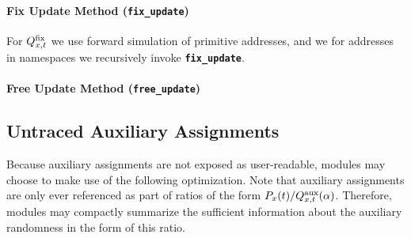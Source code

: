 \documentclass{article}
\newcommand{\code}[1]{\texttt{\small{\textbf{#1}}}}
\newcommand{\fix}[0]{\mbox{\scriptsize fix}}
\newcommand{\auxassign}[0]{\alpha}
\newcommand{\aux}[0]{\mbox{\scriptsize aux}}
\begin{document}
\paragraph{Fix Update Method (\code{fix\_update})}
For $Q^{\fix}_{x,t}$ we use forward simulation of primitive addresses, and we for addresses in namespaces we recursively invoke \code{fix\_update}.

\paragraph{Free Update Method (\code{free\_update})}

\subsection{Untraced Auxiliary Assignments}
Because auxiliary assignments are not exposed as user-readable, modules may choose to make use of the following optimization.
Note that auxiliary assignments are only ever referenced as part of ratios of the form $P_x(t) / Q^{\aux}_{x,t}(\auxassign)$.
Therefore, modules may compactly summarize the sufficient information about the auxiliary randomness in the form of this ratio.




\clearpage


\end{document}

